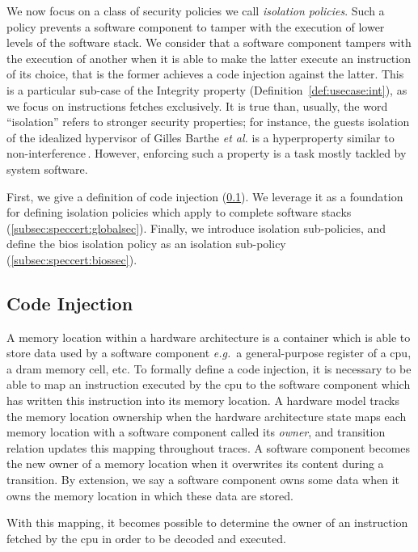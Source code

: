 We now focus on a class of security policies we call \emph{isolation policies}.
%
Such a policy prevents a software component to tamper with the execution of
lower levels of the software stack.
%
We consider that a software component tampers with the execution of another when
it is able to make the latter execute an instruction of its choice, that is the
former achieves a code injection against the latter.
%
This is a particular sub-case of the Integrity property
(Definition~\ref{def:usecase:int}), as we focus on instructions fetches
exclusively.
%
It is true than, usually, the word ``isolation'' refers to stronger security
properties; for instance, the guests isolation of the idealized hypervisor of
Gilles Barthe \emph{et al.} is a hyperproperty similar to
non-interference\,\cite{barthe2011virtcert1}.
%
However, enforcing such a property is a task mostly tackled by system software.

First, we give a definition of code injection (\ref{subsec:speccert:tampering}).
%
We leverage it as a foundation for defining isolation policies which apply to
complete software stacks (\ref{subsec:speccert:globalsec}).
%
Finally, we introduce isolation sub-policies, and define the \ac{bios} isolation
policy as an isolation sub-policy (\ref{subsec:speccert:biossec}).

\subsection{Code Injection}
\label{subsec:speccert:tampering}

A memory location within a hardware architecture is a container which is able to
store data used by a software component \emph{e.g.}~a general-purpose register
of a \ac{cpu}, a \ac{dram} memory cell, etc.
%
To formally define a code injection, it is necessary to be able to map an
instruction executed by the \ac{cpu} to the software component which has written
this instruction into its memory location.
%
A hardware model tracks the memory location ownership when the hardware
architecture state maps each memory location with a software component called
its \emph{owner}, and transition relation updates this mapping throughout
traces.
%
A software component becomes the new owner of a memory location when it
overwrites its content during a transition.
%
By extension, we say a software component owns some data when it owns the memory
location in which these data are stored.

With this mapping, it becomes possible to determine the owner of an instruction
fetched by the \ac{cpu} in order to be decoded and executed.


